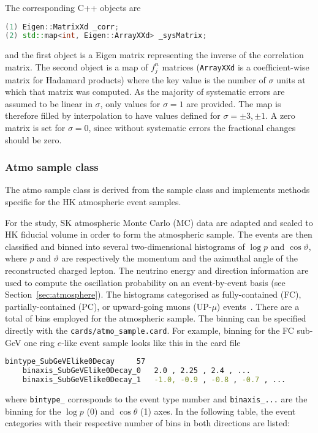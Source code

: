 \documentclass[a4paper, 11pt]{article}
\newcommand{\refsec}[1]{Section~\ref{#1}}
\begin{document}
The corresponding C++ objects are
\begin{lstlisting}[language=C++]
(1) Eigen::MatrixXd _corr;
(2) std::map<int, Eigen::ArrayXXd> _sysMatrix;
\end{lstlisting}
and the first object is a Eigen matrix representing the inverse of the correlation matrix.
The second object is a map of $f_j^n$ matrices (\texttt{ArrayXXd} is a coefficient-wise matrix for Hadamard products) %
where the key value is the number of $\sigma$ units at which that matrix was computed.
As the majority of systematic errors are assumed to be linear in $\sigma$, only values for $\sigma = 1$ are provided.
The map is therefore filled by interpolation to have values defined for $\sigma = \pm3, \pm1$.
A zero matrix is set for $\sigma = 0$, since without systematic errors the fractional changes should be zero.

\subsubsection{Atmo sample class}
\label{sec:atmo_sample}

The atmo sample class is derived from the sample class and implements methods specific for the HK atmospheric event samples.

For the study, SK atmospheric Monte Carlo (MC) data are adapted and scaled to HK fiducial volume in order to form the atmospheric sample.
The events are then classified and binned into several two-dimensional histograms of $\log p$ and $\cos\vartheta$, %
where $p$ and $\vartheta$ are respectively the momentum and the azimuthal angle of the reconstructed charged lepton.
The neutrino energy and direction information are used to compute the oscillation probability on an event-by-event basis (see \refsec{sec:atmosphere}).
The histograms categorised as fully-contained (FC), %
partially-contained (PC), or upward-going muons (UP-$\mu$) events~\cite{Jiang:2019xwn}.
There are a total of  bins employed for the atmospheric sample.
The binning can be specified directly with the \texttt{cards/atmo\_sample.card}.
For example, binning for the FC sub-GeV one ring $e$-like event sample looks like this in the card file
\begin{lstlisting}[language=bash]
    bintype_SubGeVElike0Decay	  57
    binaxis_SubGeVElike0Decay_0	  2.0 , 2.25 , 2.4 , ...
    binaxis_SubGeVElike0Decay_1	  -1.0, -0.9 , -0.8 , -0.7 , ...
\end{lstlisting}
where \texttt{bintype\_} corresponds to the event type number and \texttt{binaxis\_...} are the binning %
for the $\log p$ (0) and $\cos \theta$ (1) axes.
In the following table, the event categories with their respective number of bins in both directions are listed:
\end{document}
